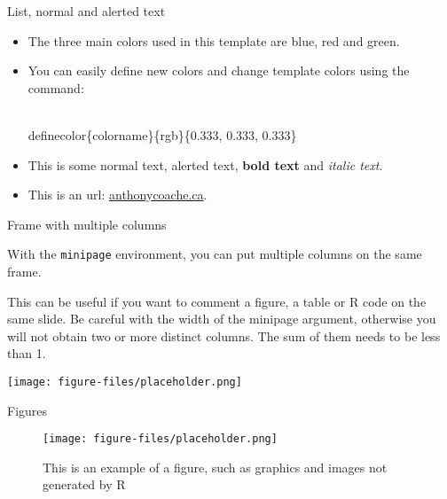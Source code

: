 \documentclass{beamer}
\begin{document}
\begin{frame}[fragile]{List, normal and alerted text}

\begin{itemize}
\setlength{\itemsep}{15pt}
\item The three main colors used in this template are \textcolor{mblue}{blue}, \textcolor{mred}{red} and \textcolor{mgreen}{green}. \\
\item You can easily define new colors and change template colors using the command: \begin{semiverbatim}\\definecolor\{colorname\}\{rgb\}\{0.333, 0.333, 0.333\}\end{semiverbatim}
\item This is some normal text, \alert{alerted text}, \textbf{bold text} and \textit{italic text}. \\
\item This is an url: \href{http://www.anthonycoache.ca}{anthonycoache.ca}.
\end{itemize}

\end{frame}


\begin{frame}{Frame with multiple columns}

\begin{minipage}[t]{0.3\linewidth}
	
	With the \texttt{minipage} environment, you can put multiple columns on the same frame.
	
\end{minipage}
\hfill
\begin{minipage}[t]{0.66\linewidth}
	
	This can be useful if you want to comment a figure, a table or R code on the same slide. Be careful with the width of the minipage argument, otherwise you will not obtain two or more distinct columns. The sum of them needs to be less than 1.
	
	\vspace*{0.25cm}
	
	\centerline{\texttt{[image: figure-files/placeholder.png]}}
	
	
\end{minipage}

\end{frame}


\begin{frame}{Figures}

\begin{figure}
\caption{This is an example of a figure, such as graphics and images not generated by R}
\centerline{\texttt{[image: figure-files/placeholder.png]}}
\end{figure}

\end{frame}
\end{document}
